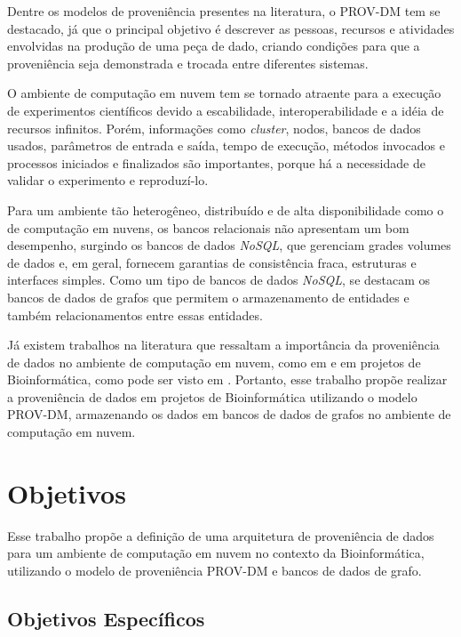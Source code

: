 Dentre os modelos de proveniência presentes na literatura, o PROV-DM tem se destacado, já que o principal objetivo é descrever as pessoas, recursos e atividades envolvidas na produção de uma peça de dado, criando condições para que a proveniência seja demonstrada e trocada entre diferentes sistemas.

O ambiente de computação em nuvem tem se tornado atraente para a execução de experimentos científicos devido a escabilidade, interoperabilidade e a idéia de recursos infinitos. Porém, informações como \textit{cluster}, nodos, bancos de dados usados, parâmetros de entrada e saída, tempo de execução, métodos invocados e processos iniciados e finalizados são importantes, porque há a necessidade de validar o experimento e reproduzí-lo.

Para um ambiente tão heterogêneo, distribuído e de alta disponibilidade como o de computação em nuvens, os bancos relacionais não apresentam um bom desempenho, surgindo os bancos de dados \textit{NoSQL}, que gerenciam grades volumes de dados e, em geral, fornecem garantias de consistência fraca, estruturas e interfaces simples. Como um tipo de bancos de dados \textit{NoSQL}, se destacam os bancos de dados de grafos que permitem o armazenamento de entidades e também relacionamentos entre essas entidades.

Já existem trabalhos na literatura que ressaltam a importância da proveniência de dados no ambiente de computação em nuvem, como em \cite{muhammad} e em projetos de Bioinformática, como pode ser visto em \cite{kiran}. Portanto, esse trabalho propõe realizar a proveniência de dados em projetos de Bioinformática utilizando o modelo PROV-DM, armazenando os dados em bancos de dados de grafos no ambiente de computação em nuvem.

\section{Objetivos}

Esse trabalho propõe a definição de uma arquitetura de proveniência de dados para um ambiente de computação em nuvem no contexto da Bioinformática, utilizando o modelo de proveniência PROV-DM e bancos de dados de grafo.


\subsection{Objetivos Específicos}

